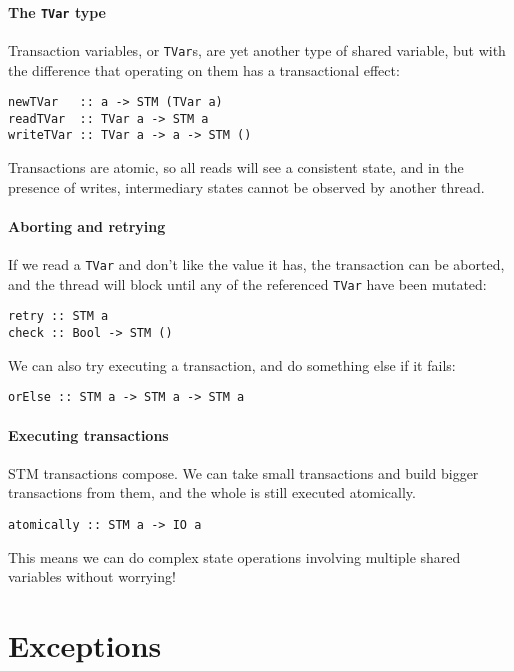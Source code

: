 \paragraph{The \texttt{TVar} type}
Transaction variables, or \verb|TVar|s, are yet another type of shared variable,
but with the difference that operating on them has a transactional effect:

\begin{verbatim}
newTVar   :: a -> STM (TVar a)
readTVar  :: TVar a -> STM a
writeTVar :: TVar a -> a -> STM ()
\end{verbatim}

Transactions are atomic, so all reads will see a consistent state, and in the
presence of writes, intermediary states cannot be observed by another thread.

\paragraph{Aborting and retrying}
If we read a \verb|TVar| and don't like the value it has, the transaction can be
aborted, and the thread will block until any of the referenced \verb|TVar| have
been mutated:

\begin{verbatim}
retry :: STM a
check :: Bool -> STM ()
\end{verbatim}

We can also try executing a transaction, and do something else if it
fails:

\begin{verbatim}
orElse :: STM a -> STM a -> STM a
\end{verbatim}

\paragraph{Executing transactions}
STM transactions compose.  We can take small transactions and build bigger
transactions from them, and the whole is still executed atomically.

\begin{verbatim}
atomically :: STM a -> IO a
\end{verbatim}

This means we can do complex state operations involving multiple shared
variables without worrying!

\section{Exceptions}
\label{sec:concurrent_haskell-exc}

